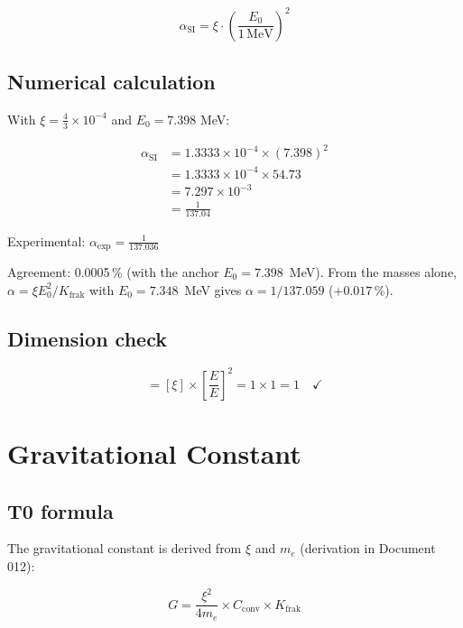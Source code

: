 	\begin{equation}
		\boxed{\alpha_{\text{SI}} = \xi \cdot \left(\frac{E_0}{1\,\text{MeV}}\right)^2}
		\label{eq:alpha_derivation}
	\end{equation}
	
	\subsection{Numerical calculation}
	
	With $\xi = \frac{4}{3} \times 10^{-4}$ and $E_0 = 7.398$ MeV:
	
	\begin{align}
		\alpha_{\text{SI}} &= 1.3333 \times 10^{-4} \times (7.398)^2 \\
		&= 1.3333 \times 10^{-4} \times 54.73 \\
		&= 7.297 \times 10^{-3} \\
		&= \frac{1}{137.04}
	\end{align}
	
	Experimental: $\alpha_{\text{exp}} = \frac{1}{137.036}$
	
	Agreement: 0.0005\,\% (with the anchor $E_0 = 7.398$~MeV). From the masses alone, $\alpha = \xi E_0^2/K_{\text{frak}}$ with $E_0 = 7.348$~MeV gives $\alpha = 1/137.059$ ($+0.017\,\%$).

	\subsection{Dimension check}
	
	\begin{equation}
		[\alpha_{\text{SI}}] = [\xi] \times \left[\frac{E}{E}\right]^2 = 1 \times 1 = 1 \quad \checkmark
	\end{equation}
	
	\section{Gravitational Constant}
	\label{sec:gravitational_constant}
	
	\subsection{T0 formula}
	
	The gravitational constant is derived from $\xi$ and $m_e$ (derivation in Document 012):
	
	\begin{equation}
		G = \frac{\xi^2}{4m_e} \times C_{\text{conv}} \times K_{\text{frak}}
		\label{eq:G_formula}
	\end{equation}
	
